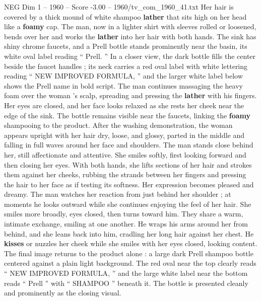 \begin{textsample}{NEG Dim 1 – 1960 – Score -3.00 – 1960/tv\_com\_1960\_41.txt}
Her hair is covered by a thick mound of white shampoo \textbf{lather} that sits high on her head like a \textbf{foamy} cap.
The man, now in a lighter shirt with sleeves rolled or loosened, bends over her and works the \textbf{lather} into her hair with both hands.
The sink has shiny chrome faucets, and a Prell bottle stands prominently near the basin, its white oval label reading “ Prell. ” In a closer view, the dark bottle fills the center beside the faucet handles ; its neck carries a red oval label with white lettering reading “ NEW IMPROVED FORMULA, ” and the larger white label below shows the Prell name in bold script.
The man continues massaging the heavy foam over the woman ’s scalp, spreading and pressing the \textbf{lather} with his fingers.
Her eyes are closed, and her face looks relaxed as she rests her cheek near the edge of the sink.
The bottle remains visible near the faucets, linking the \textbf{foamy} shampooing to the product.
After the washing demonstration, the woman appears upright with her hair dry, loose, and glossy, parted in the middle and falling in full waves around her face and shoulders.
The man stands close behind her, still affectionate and attentive.
She smiles softly, first looking forward and then closing her eyes.
With both hands, she lifts sections of her hair and strokes them against her cheeks, rubbing the strands between her fingers and pressing the hair to her face as if testing its softness.
Her expression becomes pleased and dreamy.
The man watches her reaction from just behind her shoulder ; at moments he looks outward while she continues enjoying the feel of her hair.
She smiles more broadly, eyes closed, then turns toward him.
They share a warm, intimate exchange, smiling at one another.
He wraps his arms around her from behind, and she leans back into him, cradling her long hair against her chest.
He \textbf{kisses} or nuzzles her cheek while she smiles with her eyes closed, looking content.
The final image returns to the product alone : a large dark Prell shampoo bottle centered against a plain light background.
The red oval near the top clearly reads “ NEW IMPROVED FORMULA, ” and the large white label near the bottom reads “ Prell ” with “ SHAMPOO ” beneath it.
The bottle is presented cleanly and prominently as the closing visual.

\end{textsample}
